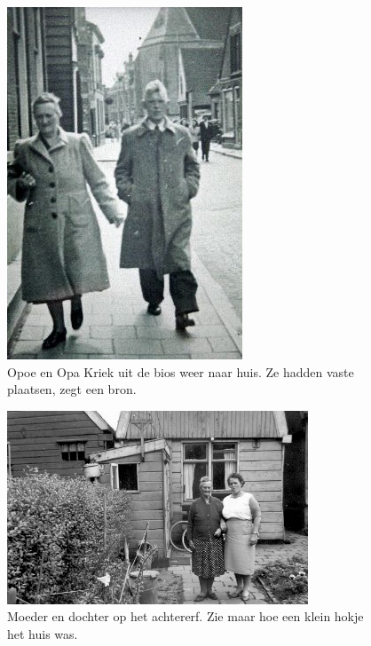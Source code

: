 \documentclass[12pt,twoside, openright]{memoir}
\begin{document}
\begin{figure}
\centering
\includegraphics[width=\textwidth]{img/ch3/vandebios}
\caption*{\footnotesize Opoe en Opa Kriek uit de bios weer naar huis. Ze hadden vaste plaatsen, zegt een bron.}
\end{figure}

\begin{figure}
\centering
\includegraphics[width=0.8\textwidth]{img/ch3/opoe82jr}
\caption*{\footnotesize Moeder en dochter op het achtererf. Zie maar hoe een klein hokje het huis was.}
\end{figure}
\end{document}
